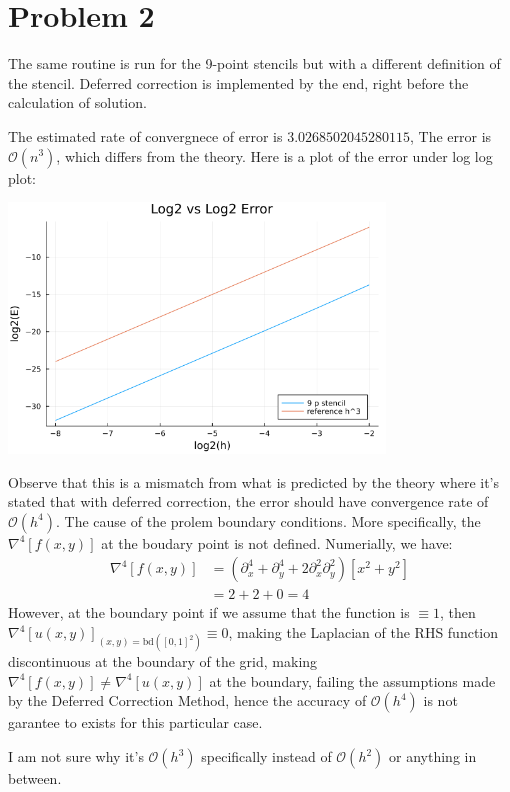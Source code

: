 \documentclass[]{article}
\begin{document}
\section*{Problem 2}
    \hspace{1.1em}
    The same routine is run for the 9-point stencils but with a different definition of the stencil. Deferred correction is implemented by the end, right before the calculation of solution. 
    \par 
    The estimated rate of convergnece of error is $3.0268502045280115$, The error is $\mathcal{O}(n^3)$, which differs from the theory. Here is a plot of the error under log log plot: 
    \begin{center}
        \includegraphics[width=10cm]{p2_fig.png}
    \end{center}
    Observe that this is a mismatch from what is predicted by the theory where it's stated that with deferred correction, the error should have convergence rate of $\mathcal{O}(h^4)$. The cause of the prolem boundary conditions. More specifically, the $\nabla^4[f(x, y)]$ at the boudary point is not defined. Numerially, we have: 
    \begin{align*}\tag{2.1}\label{eqn:2.1}
        \nabla^4[f(x, y)] &= (\partial_x^4 + \partial_y^4 + 2\partial_x^2\partial_y^2)[x^2 + y^2]
        \\
        &= 2 + 2 + 0 = 4 
    \end{align*}
    However, at the boundary point if we assume that the function is $\equiv 1$, then $\nabla^4[u(x, y)]_{(x, y) = \text{bd}([0, 1]^2)} \equiv 0$, making the Laplacian of the RHS function discontinuous at the boundary of the grid, making $\nabla^4[f(x, y)] \neq \nabla^4[u(x, y)]$ at the boundary, failing the assumptions made by the Deferred Correction Method, hence the accuracy of $\mathcal{O}(h^4)$ is not garantee to exists for this particular case.
    \par
    I am not sure why it's $\mathcal{O}(h^3)$ specifically instead of $\mathcal{O}(h^2)$ or anything in between. 
\end{document}
